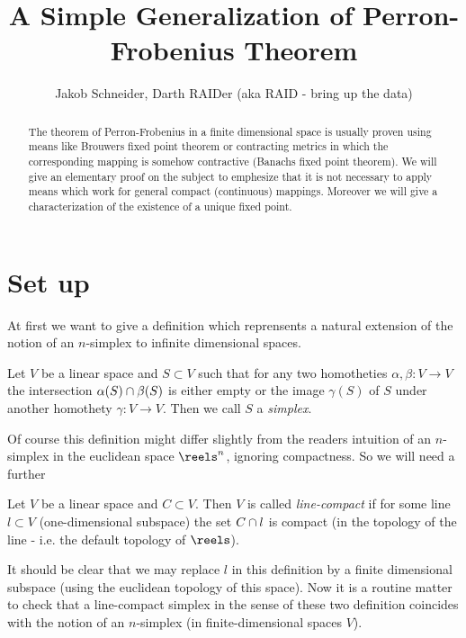 \documentclass{article}
\title{A Simple Generalization of Perron-Frobenius Theorem}
\author{Jakob Schneider, Darth RAIDer (aka RAID - bring up the data)}
\begin{document}
\maketitle

\begin{abstract}
The theorem of Perron-Frobenius in a finite dimensional space is usually proven using means like Brouwers fixed point theorem or contracting metrics in which the corresponding mapping is somehow contractive (Banachs fixed point theorem).
We will give an elementary proof on the subject to emphesize that it is not necessary to apply means which work for general compact (continuous) mappings. Moreover we will give a characterization of the existence of a unique fixed point.
\end{abstract}

\section{Set up}

At first we want to give a definition which reprensents a natural extension of the notion of an $n$-simplex to infinite dimensional spaces.

\begin{definition}[simplex]
Let $V$ be a linear space and $S\subset V$ such that for any two homotheties $\alpha, \beta:V\to V$ the intersection $\alpha(S)\cap\beta(S)$ is either empty or the image $\gamma(S)$ of $S$ under another homothety $\gamma:V\to V$. Then we call $S$ a \emph{simplex}.
\end{definition}

Of course this definition might differ slightly from the readers intuition of an $n$-simplex in the euclidean space $\reels^n$, ignoring compactness. So we will need a further

\begin{definition}
Let $V$ be a linear space and $C\subset V$. Then $V$ is called \emph{line-compact} if for some line $l\subset V$ (one-dimensional subspace) the set $C\cap l$ is compact (in the topology of the line - i.e. the default topology of $\reels$).
\end{definition}

It should be clear that we may replace $l$ in this definition by a finite dimensional subspace (using the euclidean topology of this space). Now it is a routine matter to check that a line-compact simplex in the sense of these two definition coincides with the notion of an $n$-simplex (in finite-dimensional spaces $V$).
\end{document}
